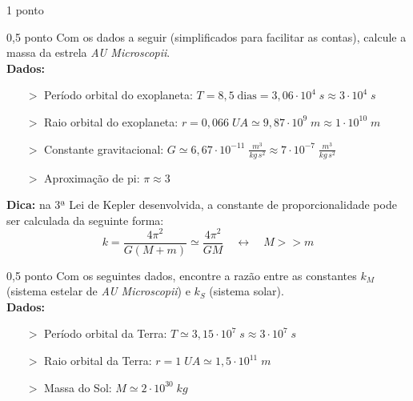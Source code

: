 \documentclass{../lista}
\begin{document}
\begin{questao}{1 ponto}
		\begin{pergunta}{0,5 ponto}
			Com os dados a seguir (simplificados para facilitar as contas), calcule a massa da estrela \textit{AU Microscopii}. \\
			\textbf{Dados:}
				\begin{itemize}
					\item[$>$] Período orbital do exoplaneta: $T = 8,5 \; \textrm{dias} = 3,06 \cdot 10^4 \; s \approx 3 \cdot 10^4 \; s$
					\item[$>$] Raio orbital do exoplaneta: $r = 0,066 \; UA \simeq 9,87 \cdot 10^9 \; m \approx 1 \cdot 10^{10} \; m$
					\item[$>$] Constante gravitacional: $G \simeq 6,67 \cdot 10^{-11} \; \frac{m^3}{kg \, s^2} \approx 7 \cdot 10^{-7} \; \frac{m^3}{kg \, s^2}$
					\item[$>$] Aproximação de pi: $\pi \approx 3$
				\end{itemize}
			\textbf{Dica:} na 3ª Lei de Kepler desenvolvida, a constante de proporcionalidade pode ser calculada da seguinte forma:
				\begin{equation}
					k = \frac{4 \pi^2}{G(M+m)} \simeq \frac{4 \pi^2}{GM} \quad \leftrightarrow \quad M>>m
				\end{equation}
			
			\espacoCalculo[7cm]
			\espacoRespostaPergunta
		\end{pergunta}

		\begin{pergunta}{0,5 ponto}
			Com os seguintes dados, encontre a razão entre as constantes $k_M$ (sistema estelar de \textit{AU Microscopii}) e $k_S$ (sistema solar). \\
			\textbf{Dados:}
				\begin{itemize}
					\item[$>$] Período orbital da Terra: $T \simeq 3,15 \cdot 10^7 \; s \approx 3 \cdot 10^7 \; s$
					\item[$>$] Raio orbital da Terra: $r = 1 \; UA \simeq 1,5 \cdot 10^{11} \; m$
					\item[$>$] Massa do Sol: $M \simeq 2 \cdot 10^{30} \; kg$
				\end{itemize}
			
			\espacoCalculo[7cm]
			\espacoRespostaPergunta
		\end{pergunta}
	\end{questao}
\end{document}
